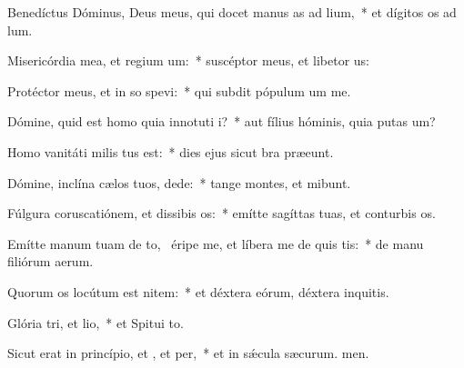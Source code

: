 \item Benedíctus Dóminus, Deus meus, qui docet manus as ad lium,~* et dígitos os ad lum.
\item Misericórdia mea, et regium um:~* suscéptor meus, et libetor us:
\item Protéctor meus, et in so spevi:~* qui subdit pópulum um  me.
\item Dómine, quid est homo quia innotuti i?~* aut fílius hóminis, quia putas um?
\item Homo vanitáti milis tus est:~* dies ejus sicut bra præeunt.
\item Dómine, inclína cælos tuos,  dede:~* tange montes, et mibunt.
\item Fúlgura coruscatiónem, et dissibis os:~* emítte sagíttas tuas, et conturbis os.
\item Emítte manum tuam de to,~\pscross{} éripe me, et líbera me de quis tis:~* de manu filiórum aerum.
\item Quorum os locútum est nitem:~* et déxtera eórum, déxtera inquitis.
\item Glória tri, et lio,~* et Spitui to.
\item Sicut erat in princípio, et , et per,~* et in sǽcula sæcurum. men.
